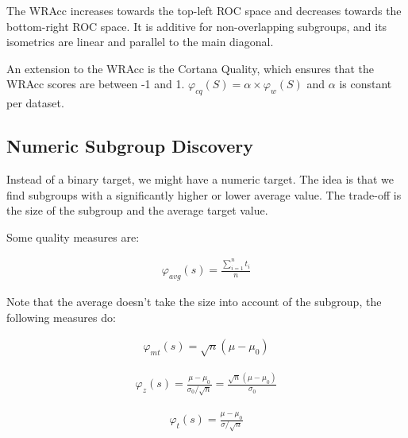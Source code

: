 The WRAcc increases towards the top-left ROC space and decreases
towards the bottom-right ROC space. It is additive for non-overlapping
subgroups, and its isometrics are linear and parallel to the main
diagonal.

\begin{definition}
  An extension to the WRAcc is the Cortana Quality, which ensures that
  the WRAcc scores are between -1 and 1. $\varphi_{cq}(S) = \alpha \times
  \varphi_{w}(S)$ and $\alpha$ is constant per dataset.
\end{definition}

\subsection{Numeric Subgroup Discovery}

Instead of a binary target, we might have a numeric target. The idea is
that we find subgroups with a significantly higher or lower average value.
The trade-off is the size of the subgroup and the average target value.

Some quality measures are:

\begin{definition}[Average]
  \begin{align*}
    \varphi_{avg}(s) = \frac{\sum^n_{i=1}t_i}{n}
  \end{align*}
\end{definition}

Note that the average doesn't take the size into account
of the subgroup, the following measures do:

\begin{definition}
  \begin{align*}
    \varphi_{mt}(s) = \sqrt{n}(\mu - \mu_0)
  \end{align*}
\end{definition}

\begin{definition}[z-score]
  \begin{align*}
    \varphi_{z}(s) = \frac{\mu - \mu_0}{\sigma_0/\sqrt{n}}
    = \frac{\sqrt{n}(\mu - \mu_0)}{\sigma_0}
  \end{align*}
\end{definition}

\begin{definition}[t-Statistic]
  \begin{align*}
    \varphi_{t}(s) = \frac{\mu - \mu_0}{\sigma/\sqrt{n}}
  \end{align*}
\end{definition}

